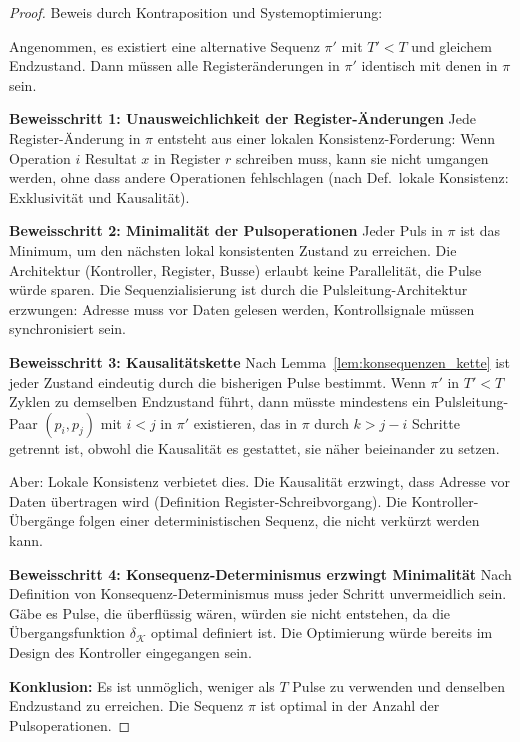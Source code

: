 \documentclass[a4paper,12pt]{article}
\theoremstyle{definition}
\begin{document}
\begin{proof}
	Beweis durch Kontraposition und Systemoptimierung:
	
	Angenommen, es existiert eine alternative Sequenz $\pi'$ mit $T' < T$ und gleichem Endzustand. Dann müssen alle Registeränderungen in $\pi'$ identisch mit denen in $\pi$ sein. 
	
	\textbf{Beweisschritt 1: Unausweichlichkeit der Register-Änderungen}
	Jede Register-Änderung in $\pi$ entsteht aus einer lokalen Konsistenz-Forderung: Wenn Operation $i$ Resultat $x$ in Register $r$ schreiben muss, kann sie nicht umgangen werden, ohne dass andere Operationen fehlschlagen (nach Def.~lokale Konsistenz: Exklusivität und Kausalität).
	
	\textbf{Beweisschritt 2: Minimalität der Pulsoperationen}
	Jeder Puls in $\pi$ ist das Minimum, um den nächsten lokal konsistenten Zustand zu erreichen. Die Architektur (Kontroller, Register, Busse) erlaubt keine Parallelität, die Pulse würde sparen. Die Sequenzialisierung ist durch die Pulsleitung-Architektur erzwungen: Adresse muss vor Daten gelesen werden, Kontrollsignale müssen synchronisiert sein.
	
	\textbf{Beweisschritt 3: Kausalitätskette}
	Nach Lemma~\ref{lem:konsequenzen_kette} ist jeder Zustand eindeutig durch die bisherigen Pulse bestimmt. Wenn $\pi'$ in $T' < T$ Zyklen zu demselben Endzustand führt, dann müsste mindestens ein Pulsleitung-Paar $(p_i, p_j)$ mit $i < j$ in $\pi'$ existieren, das in $\pi$ durch $k > j - i$ Schritte getrennt ist, obwohl die Kausalität es gestattet, sie näher beieinander zu setzen.
	
	Aber: Lokale Konsistenz verbietet dies. Die Kausalität erzwingt, dass Adresse vor Daten übertragen wird (Definition Register-Schreibvorgang). Die Kontroller-Übergänge folgen einer deterministischen Sequenz, die nicht verkürzt werden kann.
	
	\textbf{Beweisschritt 4: Konsequenz-Determinismus erzwingt Minimalität}
	Nach Definition von Konsequenz-Determinismus muss jeder Schritt unvermeidlich sein. Gäbe es Pulse, die überflüssig wären, würden sie nicht entstehen, da die Übergangsfunktion $\delta_{\mathcal{K}}$ optimal definiert ist. Die Optimierung würde bereits im Design des Kontroller eingegangen sein.
	
	\textbf{Konklusion:} Es ist unmöglich, weniger als $T$ Pulse zu verwenden und denselben Endzustand zu erreichen. Die Sequenz $\pi$ ist optimal in der Anzahl der Pulsoperationen.
\end{proof}
\end{document}
